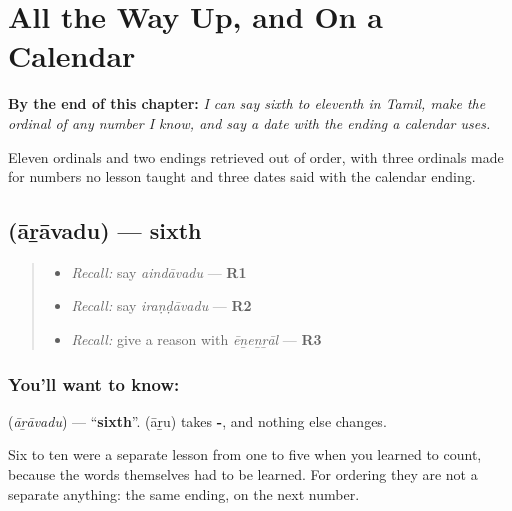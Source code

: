 
\chapter{All the Way Up, and On a Calendar}
\label{ch:ta-ordinals-to-eleventh}

\begin{chapteropening}
\textbf{By the end of this chapter:} \emph{I can say sixth to eleventh in Tamil, make the ordinal of any number I know, and say a date with the ending a calendar uses.}

Eleven ordinals and two endings retrieved out of order, with three ordinals made for numbers no lesson taught and three dates said with the calendar ending.
\end{chapteropening}

\section[\texorpdfstring{\ta{ஆறாவது} (āṟāvadu)}{ஆறாவது (āṟāvadu)}]{ (āṟāvadu) — sixth}

\label{lesson:TA-C83-sixth}



\begin{quote}
\begin{itemize}
\raggedright
  \item \emph{Recall:} say \emph{aindāvadu} — \textbf{R1}
  \item \emph{Recall:} say \emph{iraṇḍāvadu} — \textbf{R2}
  \item \emph{Recall:} give a reason with \emph{ēṉeṉṟāl} — \textbf{R3}
\end{itemize}
\end{quote}

\subsection*{You'll want to know: }
\textbf{} (\emph{āṟāvadu}) — \textquotedblleft{}\textbf{sixth}\textquotedblright{}. \textbf{} (āṟu) takes \textbf{-}, and nothing else changes.

Six to ten were a separate lesson from one to five when you learned to count, because the words themselves had to be learned. For ordering they are not a separate anything: the same ending, on the next number.

